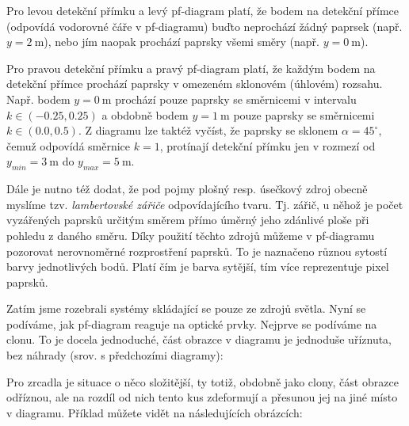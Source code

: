Pro levou detekční přímku a levý pf-diagram platí, že bodem na detekční přímce (odpovídá vodorovné čáře v pf-diagramu) buďto neprochází žádný paprsek (např. $y = 2\ \mathrm{m}$), nebo jím naopak prochází paprsky všemi směry (např. $y = 0\ \mathrm{m}$).

Pro pravou detekční přímku a pravý pf-diagram platí, že každým bodem na detekční přímce prochází paprsky v omezeném sklonovém (úhlovém) rozsahu. Např. bodem $y = 0\ \mathrm{m}$ prochází pouze paprsky se směrnicemi v intervalu $k \in (-0.25, 0.25)$ a obdobně bodem $y = 1\ \mathrm{m}$ pouze paprsky se směrnicemi $k \in (0.0, 0.5)$. Z diagramu lze taktéž vyčíst, že paprsky se sklonem $\alpha = 45^{\circ}$, čemuž odpovídá směrnice $k = 1$, protínají detekční přímku jen v rozmezí od $y_{min} = 3\ \mathrm{m}$ do $y_{max} = 5\ \mathrm{m}$.

Dále je nutno též dodat, že pod pojmy plošný resp. úsečkový zdroj obecně myslíme tzv. \emph{lambertovské zářiče} odpovídajícího tvaru. Tj. zářič, u něhož je počet vyzářených paprsků určitým směrem přímo úměrný jeho zdánlivé ploše při pohledu z daného směru. Díky použití těchto zdrojů můžeme v pf-diagramu pozorovat nerovnoměrné rozprostření paprsků. To je naznačeno různou sytostí barvy jednotlivých bodů. Platí čím je barva sytější, tím více reprezentuje pixel paprsků.

Zatím jsme rozebrali systémy skládající se pouze ze zdrojů světla. Nyní se podíváme, jak pf-diagram reaguje na optické prvky. Nejprve se podíváme na clonu. To je docela jednoduché, část obrazce v diagramu je jednoduše uříznuta, bez náhrady (srov. s předchozími diagramy):


Pro zrcadla je situace o něco složitější, ty totiž, obdobně jako clony, část obrazce odříznou, ale na rozdíl od nich tento kus zdeformují a přesunou jej na jiné místo v diagramu. Příklad můžete vidět na následujících obrázcích:



